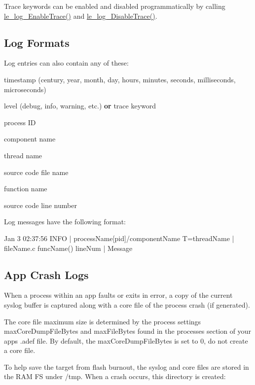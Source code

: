 Trace keywords can be enabled and disabled programmatically by calling \hyperlink{le__log_8h_a7dfe7c6d02a68b473d94d83ae71ff2b3}{le\+\_\+log\+\_\+\+Enable\+Trace()} and \hyperlink{le__log_8h_a15495177d8e9bf1fe4603cbc6bade8fc}{le\+\_\+log\+\_\+\+Disable\+Trace()}.\hypertarget{c_logging_c_log_format}{}\subsection{Log Formats}\label{c_logging_c_log_format}
Log entries can also contain any of these\+:
\begin{DoxyItemize}
\item timestamp (century, year, month, day, hours, minutes, seconds, milliseconds, microseconds)
\item level (debug, info, warning, etc.) {\bfseries or} trace keyword
\item process I\+D
\item component name
\item thread name
\item source code file name
\item function name
\item source code line number
\end{DoxyItemize}

Log messages have the following format\+:

\begin{DoxyVerb}Jan  3 02:37:56  INFO  | processName[pid]/componentName T=threadName | fileName.c funcName() lineNum | Message
\end{DoxyVerb}
\hypertarget{c_logging_c_log_debugFiles}{}\subsection{App Crash Logs}\label{c_logging_c_log_debugFiles}
When a process within an app faults or exits in error, a copy of the current syslog buffer is captured along with a core file of the process crash (if generated).

The core file maximum size is determined by the process settings {\ttfamily max\+Core\+Dump\+File\+Bytes} and {\ttfamily max\+File\+Bytes} found in the processes section of your app\textquotesingle{}s {\ttfamily }.adef file. By default, the {\ttfamily max\+Core\+Dump\+File\+Bytes} is set to 0, do not create a core file.

To help save the target from flash burnout, the syslog and core files are stored in the R\+A\+M F\+S under /tmp. When a crash occurs, this directory is created\+:

